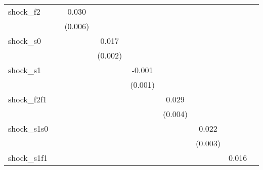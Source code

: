 {\begin{tabular}{l*{8}{c}}
\addlinespace
shock\_f2    &                     &       0.030\sym{***}&                     &                     &                     &                     &                     &                     \\
            &                     &     (0.006)         &                     &                     &                     &                     &                     &                     \\
\addlinespace
shock\_s0    &                     &                     &       0.017\sym{***}&                     &                     &                     &                     &                     \\
            &                     &                     &     (0.002)         &                     &                     &                     &                     &                     \\
\addlinespace
shock\_s1    &                     &                     &                     &      -0.001         &                     &                     &                     &                     \\
            &                     &                     &                     &     (0.001)         &                     &                     &                     &                     \\
\addlinespace
shock\_f2f1  &                     &                     &                     &                     &       0.029\sym{***}&                     &                     &                     \\
            &                     &                     &                     &                     &     (0.004)         &                     &                     &                     \\
\addlinespace
shock\_s1s0  &                     &                     &                     &                     &                     &       0.022\sym{***}&                     &                     \\
            &                     &                     &                     &                     &                     &     (0.003)         &                     &                     \\
\addlinespace
shock\_s1f1  &                     &                     &                     &                     &                     &                     &       0.016\sym{***}&                     \\

\end{tabular}}
